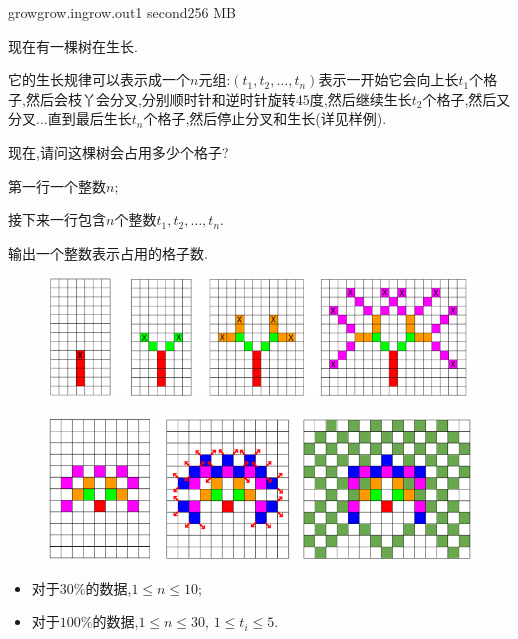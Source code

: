 \documentclass[11pt,a4paper,oneside]{article}
\begin{document}
\begin{problem}{grow}{grow.in}{grow.out}{1 second}{256 MB}
    
    现在有一棵树在生长.
    
    它的生长规律可以表示成一个$n$元组:$(t_1,t_2,\dots,t_n)$表示一开始它会向上长$t_1$个格子,然后会枝丫会分叉,分别顺时针和逆时针旋转$45$度,然后继续生长$t_2$个格子,然后又分叉...直到最后生长$t_n$个格子,然后停止分叉和生长(详见样例).
    
    现在,请问这棵树会占用多少个格子?
    
    \InputFile

    第一行一个整数$n$;
    
    接下来一行包含$n$个整数$t_1,t_2,\dots,t_n$.

    \OutputFile

	输出一个整数表示占用的格子数.

    \Example

    \begin{example}
    \end{example}
	
	\begin{figure}[htb!]
		\centering
		\includegraphics[width=0.7\linewidth]{p2s1}
		\caption{}
		\label{fig:p2s1}
	\end{figure}
	
	
	\begin{example}
	\end{example}
	
	\begin{figure}[htb!]
		\centering
		\includegraphics[width=0.7\linewidth]{p2s2}
		\caption{}
		\label{fig:p2s2}
	\end{figure}
	
	
	
	\begin{example}
		\exmp{
			1
			3
		}{
			3
		}%
	\end{example}

    \Note
    
    \begin{itemize}
    	\item 对于$30\%$的数据,$1 \leq n \leq 10$;
        \item 对于$100\%$的数据,$1 \leq n \leq 30$, $1 \leq t_i \leq 5$.
    \end{itemize}

\end{problem}
\end{document}
